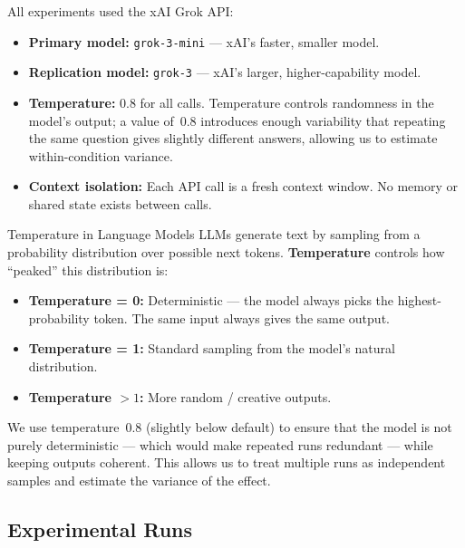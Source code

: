 \documentclass[12pt, letterpaper]{article}
\begin{document}
All experiments used the xAI Grok API:
\begin{itemize}[noitemsep]
  \item \textbf{Primary model:} \texttt{grok-3-mini} --- xAI's faster, smaller model.
  \item \textbf{Replication model:} \texttt{grok-3} --- xAI's larger, higher-capability model.
  \item \textbf{Temperature:} 0.8 for all calls. Temperature controls randomness in
        the model's output; a value of~0.8 introduces enough variability that
        repeating the same question gives slightly different answers, allowing us to
        estimate within-condition variance.
  \item \textbf{Context isolation:} Each API call is a fresh context window. No
        memory or shared state exists between calls.
\end{itemize}

\begin{keyconcept}{Temperature in Language Models}
  LLMs generate text by sampling from a probability distribution over possible next
  tokens. \textbf{Temperature} controls how ``peaked'' this distribution is:
  \begin{itemize}[noitemsep]
    \item \textbf{Temperature = 0:} Deterministic --- the model always picks the
          highest-probability token. The same input always gives the same output.
    \item \textbf{Temperature = 1:} Standard sampling from the model's natural distribution.
    \item \textbf{Temperature $> 1$:} More random / creative outputs.
  \end{itemize}
  We use temperature~0.8 (slightly below default) to ensure that the model is not
  purely deterministic --- which would make repeated runs redundant --- while keeping
  outputs coherent. This allows us to treat multiple runs as independent samples
  and estimate the variance of the effect.
\end{keyconcept}

\subsection{Experimental Runs}
\end{document}
